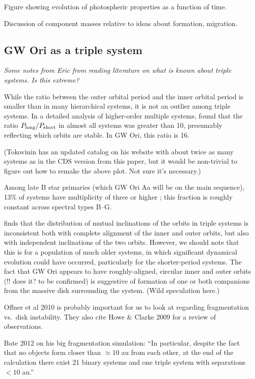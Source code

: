 \documentclass{aastex6}
\begin{document}
Figure showing evolution of photospheric properties as a function of time.

Discussion of component masses relative to ideas about formation, migration.

\subsection{GW Ori as a triple system}

{\it Some notes from Eric from reading literature on what is known about triple systems.  Is this extreme?}

While the ratio between the outer orbital period and the inner orbital period is smaller than in many hierarchical systems, it is not an outlier among triple systems.  In a detailed analysis of higher-order multiple systems, \citet{tokovinin97} found that the ratio $P_{\rm long} / P_{\rm short}$ in almost all systems was greater than 10, presumably reflecting which orbits are stable.  In GW Ori, this ratio is 16.

(Tokovinin has an updated catalog on his website with about twice as many systems as in the CDS version from this paper, but it would be non-trivial to figure out how to remake the above plot.  Not sure it's necessary.)

Among late B star primaries (which GW Ori Aa will be on the main sequence), 13\% of systems have multiplicity of three or higher \citep{eggleton08}; this fraction is roughly constant across spectral types B--G.

\citet{tokovinin97} finds that the distribution of mutual inclinations of the orbits in triple systems is inconsistent both with complete alignment of the inner and outer orbits, but also with independent inclinations of the two orbits.  However, we should note that this is for a population of much older systems, in which significant dynamical evolution could have occurred, particularly for the shorter-period systems.  The fact that GW Ori appears to have roughly-aligned, circular inner and outer orbits (!! does it?  to be confirmed) is suggestive of formation of one or both companions from the massive disk surrounding the system.  (Wild speculation here.)

Offner et al 2010 is probably important for us to look at regarding fragmentation vs.\ disk instability.  They also cite Howe \& Clarke 2009 for a review of observations.

Bate 2012 on his big fragmentation simulation: ``In particular, despite the fact that no objects form closer than $\approx 10$ au from each other, at the end of the calculation there exist 21 binary systems and one triple system with separations $<10$ au.''
\end{document}
